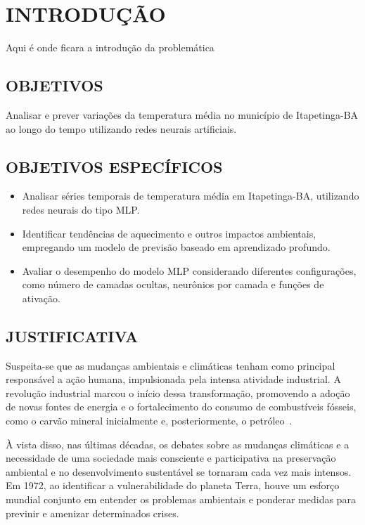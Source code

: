 \chapter{INTRODUÇÃO}

Aqui é onde ficara a introdução da problemática

\section{OBJETIVOS}
    Analisar e prever variações da temperatura média no município de Itapetinga-BA ao longo do tempo
    utilizando redes neurais artificiais.

\section{OBJETIVOS ESPECÍFICOS}
    \begin{itemize}
        \item Analisar séries temporais de temperatura média em Itapetinga-BA, utilizando redes neurais 
        do tipo MLP.
        \item Identificar tendências de aquecimento e outros impactos ambientais, empregando um modelo 
        de previsão baseado em aprendizado profundo.
        \item Avaliar o desempenho do modelo MLP considerando diferentes configurações, como número de 
        camadas ocultas, neurônios por camada e funções de ativação.
    \end{itemize}

\section{JUSTIFICATIVA}
    Suspeita-se que as mudanças ambientais e climáticas tenham como principal responsável a ação humana, 
    impulsionada pela intensa atividade industrial. A revolução industrial marcou o início dessa transformação, 
    promovendo a adoção de novas fontes de energia e o fortalecimento do consumo de combustíveis fósseis, como o 
    carvão mineral inicialmente e, posteriormente, o petróleo~\cite{mendoncca2006aquecimento}.
    
    À vista disso, nas últimas décadas, os debates sobre as mudanças climáticas e a necessidade de uma sociedade 
    mais consciente e participativa na preservação ambiental e no desenvolvimento sustentável se tornaram cada 
    vez mais intensos. Em 1972, ao identificar a vulnerabilidade do planeta Terra, houve um esforço mundial conjunto
    em entender os problemas ambientais e ponderar medidas para previnir e amenizar determinados crises.
    
